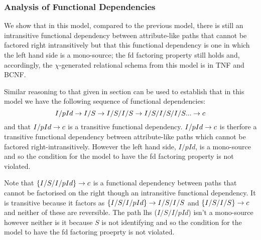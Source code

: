 \subsubsection{Analysis of Functional Dependencies}
 
We show that in this model, compared to the previous model,  there is still
 an intransitive functional dependency between attribute-like paths that cannot be factored right intransitively but that this functional dependency is one in which the left hand side 
is a mono-source; the fd factoring property still holds and,
accordingly, the $\chi$-generated relational schema from this model is in TNF and BCNF.


Similar reasoning to that given in section  can be used to establish that 
in this model we have the following sequence of functional dependencies:
\begin{equation}
I/pId \rightarrow I/S \rightarrow I/S/I/S \rightarrow I/S/I/S/I/S ... \rightarrow c
\end{equation}
and that $I/pId \rightarrow c$ is a transitive functional dependency.  $I/pId \rightarrow c$ is therfore a transitive functional dependency between attribute-like paths which cannot
be factored right-intransitively. However  the left hand side, $I/pId$, is a mono-source and so the condition for the model to have the fd factoring property is not violated.

Note that $\left\{I/S/I/pId\right\} \rightarrow c$ is a functional dependency between  paths that cannot be factorised on the right though an intransitive functional dependency. 
 It is transitive because it factors as $\left\{I/S/I/pId\right\} \rightarrow I/S/I/S$ and $\left\{I/S/I/S\right\} \rightarrow c$ and neither of these are reversible. The path lhs ($I/S/I/pId$) isn't a mono-source 
however neither is it  because $S$ is not identifying and so the condition for the model to have the fd factoring proeprty is not violated.

